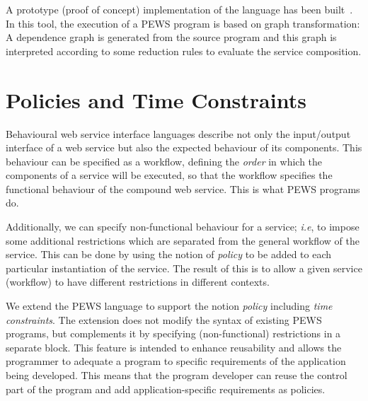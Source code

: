 \documentclass{sig-alternate}
\begin{document}
A prototype (proof of concept) implementation of the language has been built~\cite{BaH08}. 
In this tool, the execution of a PEWS program is based on graph transformation:
A dependence graph is generated from the source program and this graph is 
interpreted according to some reduction rules to evaluate the
service composition.


\section{Policies and Time Constraints} \label{sec:pewsContract-model}



Behavioural web service interface languages describe not only the input/output interface of a web service but also the expected behaviour of its components. This behaviour can be specified as a workflow, defining the \textit{order} in which the components of a service will be executed, so that the workflow specifies the functional behaviour of the compound web service. This is what PEWS programs do.

Additionally, we can specify non-functional behaviour for a service;
\textit{i.e}, to impose some additional restrictions which are separated from
the general workflow of the service. This can be done by using the notion of
\textit{policy} to be added to each particular instantiation of the service.
The result of this is to allow a given service (workflow) to have different
restrictions in different contexts.

We extend the PEWS language to support the notion \textit{policy} including
\textit{time constraints}. The extension does not modify the syntax of existing
PEWS programs, but complements it by specifying (non-functional) restrictions in
a separate block. This feature is intended to enhance reusability and allows the
programmer to adequate a program to specific requirements of the application
being developed. This means that the program developer can reuse the control
part of the program and add application-specific requirements as policies.
\end{document}
